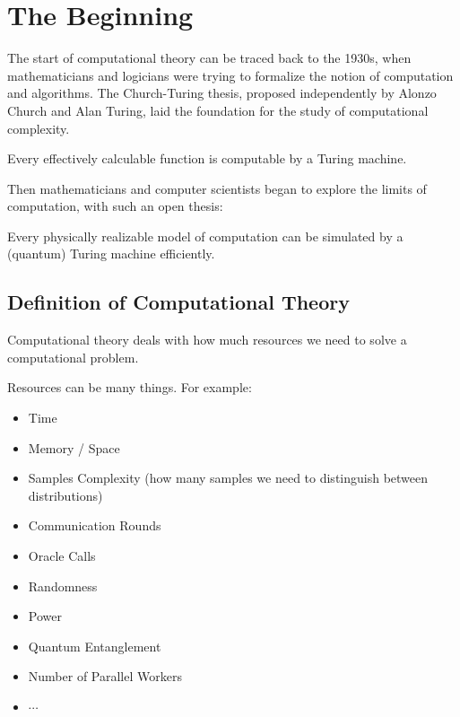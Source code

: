 \chapter{The Beginning}

The start of computational theory can be traced back to the 1930s, when mathematicians and logicians were trying to formalize the notion of computation and algorithms. The Church-Turing thesis, proposed independently by Alonzo Church and Alan Turing, laid the foundation for the study of computational complexity.

\begin{theorem}
	Every effectively calculable function is computable by a Turing machine.
\end{theorem}

Then mathematicians and computer scientists began to explore the limits of computation, with such an open thesis:

\begin{problem}
	Every physically realizable model of computation can be simulated by a (quantum) Turing machine efficiently.
\end{problem}

\section{Definition of Computational Theory}

\begin{remark}
	Computational theory deals with how much resources we need to solve a computational problem.
\end{remark}

Resources can be many things. For example:
\begin{itemize}
	\item Time
	\item Memory / Space
	\item Samples Complexity (how many samples we need to distinguish between distributions)
	\item Communication Rounds
	\item Oracle Calls
	\item Randomness
	\item Power
	\item Quantum Entanglement
	\item Number of Parallel Workers
	\item $\cdots$
\end{itemize}

